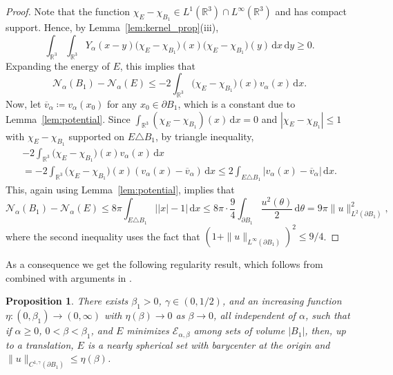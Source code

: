 \documentclass[a4paper,11pt,reqno]{amsart}
\numberwithin{equation}{section}
\newtheorem{proposition}[theorem]{Proposition}
\theoremstyle{remark}
\theoremstyle{definition}
\renewcommand{\bar}[1]{\overline{#1}}
\newcommand{\R}{\mathbb R}
\newcommand{\dd}{\,\mathrm{d}}
\newcommand{\defeq}{\coloneqq}
\newcommand{\asymm}[2]{#1\triangle #2}
\newcommand{\ene}{\mathcal{E}_{\alpha,\beta}}
\newcommand{\nl}{\mathcal{N}_{\alpha}}
\newcommand{\pt}{\partial}
\renewcommand{\leq}{\leqslant}
\renewcommand{\geq}{\geqslant}
\begin{document}
\begin{proof}
Note that the function $\chi_E-\chi_{B_1} \in L^1(\R^3)\cap L^\infty(\R^3)$ and has compact support. Hence, by Lemma~\ref{lem:kernel_prop}(iii), 
	\[
		\int_{\R^3}\int_{\R^3} Y_\alpha(x-y)\big(\chi_E-\chi_{B_1}\big)(x)\big(\chi_E-\chi_{B_1}\big)(y)\dd x \dd y \geq 0.
	\]
Expanding the energy of $E$, this implies that
	\[
		\nl(B_1)-\nl(E) \leq -2\int_{\R^3}\big(\chi_E-\chi_{B_1}\big)(x)v_\alpha(x)\dd x.
	\]
Now, let $\bar{v}_\alpha\defeq v_\alpha(x_0)$ for any $x_0\in\pt B_1$, which is a constant due to Lemma~\ref{lem:potential}. Since $\int_{\R^3}(\chi_E-\chi_{B_1})(x)\dd x =0$ and $|\chi_E-\chi_{B_1}|\leq 1$ with $\chi_E-\chi_{B_1}$ supported on $\asymm{E}{B_1}$, by triangle inequality,
	\begin{multline*}
			-2\int_{\R^3} \big(\chi_E-\chi_{B_1}\big)(x)v_\alpha(x)\dd x \\= -2\int_{\R^3} \big(\chi_E-\chi_{B_1}\big)(x)(v_\alpha(x)-\bar{v}_\alpha)\dd x \leq 2 \int_{\asymm{E}{B_1}}|v_\alpha(x)-\bar{v}_{\alpha}|\dd x. 
	\end{multline*}
This, again using Lemma~\ref{lem:potential}, implies that
	\[
		\nl(B_1)-\nl(E) \leq 8\pi\int_{\asymm{E}{B_1}}\big||x|-1\big|\dd x \leq 8\pi\cdot \frac{9}{4}\int_{\pt B_1} \frac{u^2(\theta)}{2}\dd \theta = 9\pi \|u\|_{L^2(\pt B_1)}^2,
	\]
where the second inequality uses the fact that $(1+\|u\|_{L^\infty(\partial B_1)})^2\leq 9/4$.
\end{proof}

As a consequence we get the following regularity result, which follows from \cite[Chapter 21]{Mag} combined with arguments in \cite{CFP,GMP}.

	\begin{proposition}\label{prop:regularity}
		There exists $\beta_1>0$, $\gamma\in(0,1/2)$, and an increasing function $\eta\colon(0,\beta_1)\to(0,\infty)$ with $\eta(\beta)\to 0$ as $\beta\to 0$, all independent of $\alpha$, such that if $\alpha\geq 0$, $0<\beta<\beta_1$, and $E$ minimizes $\ene$ among sets of volume $|B_1|$, then, up to a translation, $E$ is a nearly spherical set with barycenter at the origin and $\|u\|_{C^{1,\gamma}(\pt B_1)}\leq \eta(\beta)$.
	\end{proposition}
\end{document}
